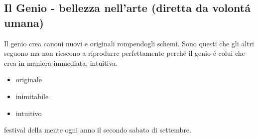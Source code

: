 \documentclass{article}
\begin{document}
\subsection{Il Genio - bellezza nell'arte (diretta da volontá umana)}
Il genio crea canoni nuovi e originali rompendogli schemi. Sono questi che gli altri seguono ma non riescono a riprodurre perfettamente perché il genio é colui che crea in maniera immediata, intuitiva.
\begin{itemize}
\item originale
\item inimitabile
\item intuitivo
\end{itemize}
\pagebreak
festival della mente ogni anno il secondo sabato di settembre.
\end{document}
